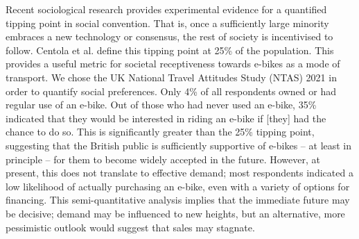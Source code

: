 Recent sociological research provides experimental evidence for a quantified tipping point in social convention. That is, once a sufficiently large minority embraces a new technology or consensus, the rest of society is incentivised to follow. Centola et al. define this tipping point at 25\% of the population. This provides a useful metric for societal receptiveness towards e-bikes as a mode of transport. We chose the UK National Travel Attitudes Study (NTAS) 2021 in order to quantify social preferences. Only 4\% of all respondents owned or had regular use of an e-bike. Out of those who had never used an e-bike, 35\% indicated that they would be interested in riding an e-bike if [they] had the chance to do so.  This is significantly greater than the 25\% tipping point, suggesting that the British public is sufficiently supportive of e-bikes – at least in principle – for them to become widely accepted in the future. However, at present, this does not translate to effective demand; most respondents indicated a low likelihood of actually purchasing an e-bike, even with a variety of options for financing. This semi-quantitative analysis implies that the immediate future may be decisive; demand may be influenced to new heights, but an alternative, more pessimistic outlook would suggest that sales may stagnate.

